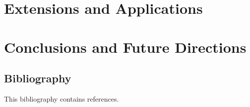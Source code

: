 \documentclass[12pt]{cmuthesis}
\begin{document}
\part{Extensions and Applications}




\part{Conclusions and Future Directions}


\chapter*{Bibliography}

\vspace{-25mm}
This bibliography contains  references.
\vspace{10mm}

\printbibliography[heading=none]
\end{document}
